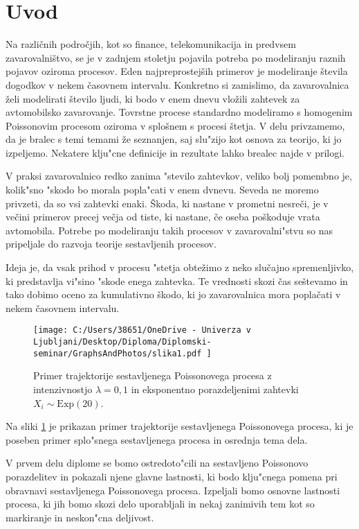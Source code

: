 \documentclass[12pt, a4paper, reqno]{amsart}
\theoremstyle{definition}
\theoremstyle{plain}
\newcommand{\1}{\mathds{1}}
\begin{document}
\section{Uvod}
Na različnih področjih, kot so finance, telekomunikacija in predvsem zavarovalništvo, 
se je v zadnjem stoletju pojavila potreba po modeliranju raznih pojavov oziroma procesov. Eden najpreprostejših primerov 
je modeliranje števila dogodkov v nekem časovnem intervalu. Konkretno si zamislimo, da zavarovalnica 
želi modelirati število ljudi, ki bodo v enem dnevu vložili zahtevek za avtomobilsko zavarovanje. 
Tovrstne procese standardno modeliramo s homogenim Poissonovim procesom oziroma v splošnem s procesi 
štetja. V delu privzamemo, da je bralec s temi temami že seznanjen, saj slu"zijo kot osnova za teorijo, 
ki jo izpeljemo. Nekatere klju"cne definicije in rezultate lahko brealec najde v prilogi.

V praksi zavarovalnico redko zanima "stevilo zahtevkov, veliko bolj pomembno je, kolik"sno "skodo bo 
morala popla"cati v enem dvnevu. Seveda ne 
moremo privzeti, da so vsi zahtevki enaki. Škoda, ki nastane v prometni nesreči, je v večini primerov precej 
večja od tiste, ki nastane, če oseba poškoduje vrata avtomobila. Potrebe po modeliranju takih procesov
v zavarovalni"stvu so nas pripeljale do razvoja teorije sestavljenih procesov.

Ideja je, da vsak prihod v procesu "stetja obtežimo z neko slučajno spremenljivko, ki predstavlja vi"sino "skode enega
zahtevka. 
Te vrednosti skozi čas seštevamo in tako dobimo oceno za kumulativno škodo, ki jo zavarovalnica 
mora poplačati v nekem časovnem intervalu.
    \begin{figure}[H]
        \centering
        \texttt{[image: 
            C:/Users/38651/OneDrive - Univerza v Ljubljani/Desktop/Diploma/Diplomski-seminar/GraphsAndPhotos/slika1.pdf
            ]}
        \caption{Primer trajektorije sestavljenega Poissonovega procesa z intenzivnostjo $\lambda = 0{,}1$ in
        eksponentno porazdeljenimi zahtevki $X_i\sim\text{Exp}(20)$.}
        \label{fig:slika1}
    \end{figure}
    \noindent
    Na sliki \ref{fig:slika1} je prikazan primer trajektorije sestavljenega Poissonovega procesa, ki je 
    poseben primer splo"snega sestavljenega procesa in osrednja tema dela. 

    V prvem delu diplome se bomo ostredoto"cili na sestavljeno Poissonovo porazdelitev in pokazali 
    njene glavne lastnosti, ki bodo klju"cnega pomena pri obravnavi sestavljenega Poissonovega procesa. 
    Izpeljali bomo osnovne lastnosti procesa, ki jih bomo skozi delo uporabljali in nekaj zanimivih tem 
    kot so markiranje in neskon"cna deljivost.
\end{document}
